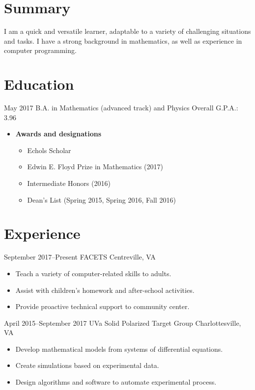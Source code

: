 \documentclass[10pt]{article}
\begin{document}


\section*{Summary}
I am a quick and versatile learner, adaptable to a variety of
challenging situations and tasks. I have a strong background in
mathematics, as well as experience in computer programming.

\section*{Education}
{May 2017}
{B.A. in Mathematics (advanced track) and Physics}
{Overall G.P.A.: 3.96}
\begin{itemize}
\item \textbf{Awards and designations}
  \begin{itemize}
  \item Echols Scholar
  \item Edwin E. Floyd Prize in Mathematics (2017)
  \item Intermediate Honors (2016)
  \item Dean's List (Spring 2015, Spring 2016, Fall 2016)
  \end{itemize}
\end{itemize}

\section*{Experience}
{September 2017--Present}
{FACETS}
{Centreville, VA}
\begin{itemize}
\item Teach a variety of computer-related skills to adults.
\item Assist with children's homework and after-school activities.
\item Provide proactive technical support to community center.
\end{itemize}

{April 2015--September 2017}
{UVa Solid Polarized Target Group}
{Charlottesville, VA}
\begin{itemize}
\item Develop mathematical models from systems of differential equations.
\item Create simulations based on experimental data.
\item Design algorithms and software to automate experimental process.
\end{itemize}
\end{document}
